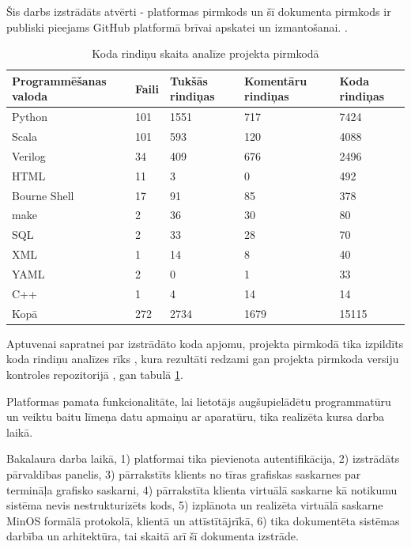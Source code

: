 Šis darbs izstrādāts atvērti - platformas pirmkods un šī dokumenta pirmkods ir
publiski pieejams GitHub platformā brīvai apskatei un izmantošanai.
\cite{VeinbahsKrisjanisTestbed} \cite{VeinbahsKrisjanisThesis}.

\begin{table}[H]
    \begin{tabular}{ |p{3cm}|p{3cm}|p{3cm}|p{3cm}|p{3cm}| }
    \hline
    Programmēšanas valoda&Faili&Tukšās rindiņas&Komentāru rindiņas&Koda rindiņas\\
    \hline
    Python & 101 & 1551 & 717 & 7424\\
    Scala & 101 & 593 & 120 & 4088\\
    Verilog & 34 & 409 & 676 & 2496\\
    HTML & 11 & 3 & 0 & 492\\
    Bourne Shell & 17 & 91 & 85 & 378\\
    make & 2 & 36 & 30 & 80\\
    SQL & 2 & 33 & 28 & 70\\
    XML & 1 & 14 & 8 & 40\\
    YAML & 2 & 0 & 1 & 33\\
    C++ & 1 & 4 & 14 & 14\\
    \hhline{|=|=|=|=|=|}
    Kopā & 272 & 2734 & 1679 & 15115\\
    \hline
    \end{tabular}
    \centering
    \captionsetup{justification=centering}
    \caption{Koda rindiņu skaita analīze projekta pirmkodā}
    \label{table:cloc}
\end{table}

Aptuvenai sapratnei par izstrādāto koda apjomu, projekta pirmkodā tika izpildīts
koda rindiņu analīzes rīks \cite{AlDanialCloc}, kura rezultāti redzami gan projekta
pirmkoda versiju kontroles repozitorijā \cite{VeinbahsKrisjanisTestbed}, gan tabulā
\ref{table:cloc}.

Platformas pamata funkcionalitāte, lai lietotājs augšupielādētu programmatūru un
veiktu baitu līmeņa datu apmaiņu ar aparatūru, tika realizēta kursa darba laikā.

Bakalaura darba laikā, 1) platformai tika pievienota autentifikācija, 2)
izstrādāts pārvaldības panelis, 3) pārrakstīts klients no tīras grafiskas
saskarnes par termināļa grafisko saskarni, 4) pārrakstīta klienta virtuālā
saskarne kā notikumu sistēma nevis nestrukturizēts kods, 5) izplānota un
realizēta virtuālā saskarne MinOS formālā protokolā, klientā un attīstītājrīkā,
6) tika dokumentēta sistēmas darbība un arhitektūra, tai skaitā arī šī dokumenta
izstrāde.

